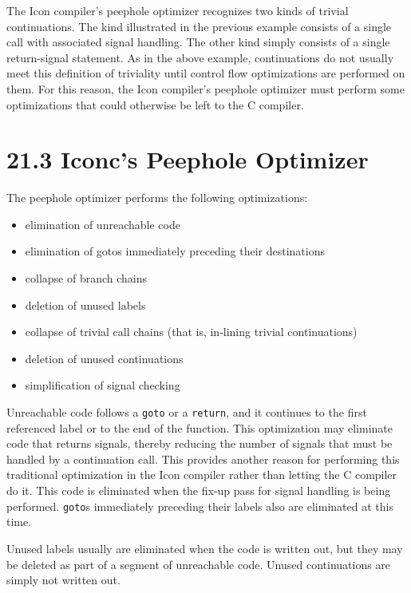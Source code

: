 The Icon compiler's peephole optimizer recognizes two kinds of trivial
continuations. The kind illustrated in the previous example consists
of a single call with associated signal handling. The other kind
simply consists of a single return-signal statement. As in the above
example, continuations do not usually meet this definition of
triviality until control flow optimizations are performed on them. For
this reason, the Icon compiler's peephole optimizer must perform some
optimizations that could otherwise be left to the C compiler.


\section[21.3 Iconc's Peephole Optimizer]{21.3 Iconc's Peephole Optimizer}

The peephole optimizer performs the following optimizations: 

\liststyleLxxxiv
\begin{itemize}
\item 
elimination of unreachable code 
\item 
elimination of gotos immediately preceding their destinations 
\item 
collapse of branch chains 
\item 
deletion of unused labels 
\item 
collapse of trivial call chains (that is, in-lining trivial continuations) 
\item 
deletion of unused continuations 
\item 
simplification of signal checking 
\end{itemize}

Unreachable code follows a \texttt{goto} or a \texttt{return}, and it
continues to the first referenced label or to the end of the function.
This optimization may eliminate code that returns signals, thereby
reducing the number of signals that must be handled by a continuation
call. This provides another reason for performing this traditional
optimization in the Icon compiler rather than letting the C compiler
do it. This code is eliminated when the fix-up pass for signal
handling is being performed. \texttt{goto}s immediately preceding their labels
also are eliminated at this time.

Unused labels usually are eliminated when the code is written out, but
they may be deleted as part of a segment of unreachable code. Unused
continuations are simply not written out.

